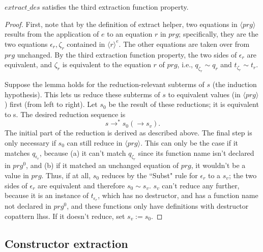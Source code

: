 \begin{lemma}

$extract\_des$ satisfies the third extraction function property.

\begin{proof}

First, note that by the definition of extract helper, two equations in $\langle prg \rangle$ results from the application of $e$ to an equation $r$ in $prg$; specifically, they are the two equations $\epsilon_r, \zeta_r$ contained in $\langle r \rangle^e$. The other equations are taken over from $prg$ unchanged. By the third extraction function property, the two sides of $\epsilon_r$ are equivalent, and $\zeta_r$ is equivalent to the equation $r$ of $prg$, i.e., $q_{\zeta_r} \sim q_r$ and $t_{\zeta_r} \sim t_r$.

Suppose the lemma holds for the reduction-relevant subterms of $s$ (the induction hypothesis). This lets us reduce these subterms of $s$ to equivalent values (in $\langle prg \rangle$) first (from left to right). Let $s_0$ be the result of these reductions; it is equivalent to s. The desired reduction sequence is
\begin{equation*}
s \longrightarrow^* s_0 (\longrightarrow s_v).
\end{equation*}
The initial part of the reduction is derived as described above. The final step is only necessary if $s_0$ can still reduce in $\langle prg \rangle$. This can only be the case if it matches $q_{\epsilon_r}$, because (a) it can't match $q_{\zeta_r}$ since its function name isn't declared in $prg^0$, and (b) if it matched an unchanged equation of $prg$, it wouldn't be a value in $prg$. Thus, if at all, $s_0$ reduces by the ``Subst" rule for $\epsilon_r$ to a $s_v$; the two sides of $\epsilon_r$ are equivalent and therefore $s_0 \sim s_v$. $s_v$ can't reduce any further, because it is an instance of $t_{\epsilon_r}$, which has no destructor, and has a function name not declared in $prg^0$, and these functions only have definitions with destructor copattern lhss. If it doesn't reduce, set $s_v := s_0$.

\end{proof}

\end{lemma}

\subsection{Constructor extraction}

